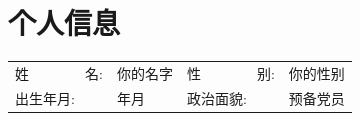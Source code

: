 \begin{figure}[h]
    \begin{minipage}{0.82\textwidth}
        \section{\makebox[\widthof{\faAddressCard}][c]{\color{FOSU_Red}{\faAddressCard}}\quad 个人信息}
        \begin{tabularx}{\linewidth}{p{}Xp{}X}
            姓\ \ \ \ \ \ \ \ 名: & 你的名字 & 
            性\ \ \ \ \ \ \ \ 别: & 你的性别  \\
            出生年月:              & 年月 & 
            政治面貌:              & 预备党员 \\
           
        \end{tabularx}
    \end{minipage}
    \hspace{2em}
    \begin{minipage}{0.12\textwidth}   
        \setlength{\fboxsep}{0pt}
    \end{minipage}

\end{figure}
\vspace{-1em}

